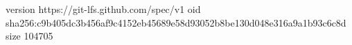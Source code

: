 version https://git-lfs.github.com/spec/v1
oid sha256:c9b405dc3b456af9c4152eb45689e58d93052b8be130d048e316a9a1b93c6c8d
size 104705
